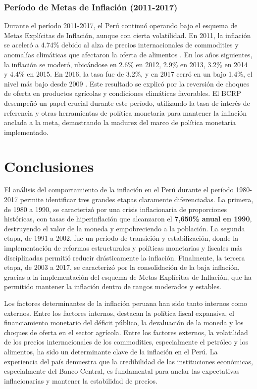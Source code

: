 \documentclass[
  stu,
  floatsintext,
  longtable,
  a4paper,
  nolmodern,
  notxfonts,
  notimes,
  12pt,
  colorlinks=true,linkcolor=blue,citecolor=blue,urlcolor=blue]{apa7}
\begin{document}
\subsubsection{Período de Metas de Inflación
(2011-2017)}\label{peruxedodo-de-metas-de-inflaciuxf3n-2011-2017}

Durante el período 2011-2017, el Perú continuó operando bajo el esquema
de Metas Explícitas de Inflación, aunque con cierta volatilidad. En
2011, la inflación se aceleró a 4.74\% debido al alza de precios
internacionales de commodities y anomalías climáticas que afectaron la
oferta de alimentos . En los años siguientes, la inflación se moderó,
ubicándose en 2.6\% en 2012, 2.9\% en 2013, 3.2\% en 2014 y 4.4\% en
2015. En 2016, la tasa fue de 3.2\%, y en 2017 cerró en un bajo 1.4\%,
el nivel más bajo desde 2009 . Este resultado se explicó por la
reversión de choques de oferta en productos agrícolas y condiciones
climáticas favorables. El BCRP desempeñó un papel crucial durante este
período, utilizando la tasa de interés de referencia y otras
herramientas de política monetaria para mantener la inflación anclada a
la meta, demostrando la madurez del marco de política monetaria
implementado.

\section{Conclusiones}\label{conclusiones}

El análisis del comportamiento de la inflación en el Perú durante el
período 1980-2017 permite identificar tres grandes etapas claramente
diferenciadas. La primera, de 1980 a 1990, se caracterizó por una crisis
inflacionaria de proporciones históricas, con tasas de hiperinflación
que alcanzaron el \textbf{7,650\% anual en 1990}, destruyendo el valor
de la moneda y empobreciendo a la población. La segunda etapa, de 1991 a
2002, fue un período de transición y estabilización, donde la
implementación de reformas estructurales y políticas monetarias y
fiscales más disciplinadas permitió reducir drásticamente la inflación.
Finalmente, la tercera etapa, de 2003 a 2017, se caracterizó por la
consolidación de la baja inflación, gracias a la implementación del
esquema de Metas Explícitas de Inflación, que ha permitido mantener la
inflación dentro de rangos moderados y estables.

Los factores determinantes de la inflación peruana han sido tanto
internos como externos. Entre los factores internos, destacan la
política fiscal expansiva, el financiamiento monetario del déficit
público, la devaluación de la moneda y los choques de oferta en el
sector agrícola. Entre los factores externos, la volatilidad de los
precios internacionales de los commodities, especialmente el petróleo y
los alimentos, ha sido un determinante clave de la inflación en el Perú.
La experiencia del país demuestra que la credibilidad de las
instituciones económicas, especialmente del Banco Central, es
fundamental para anclar las expectativas inflacionarias y mantener la
estabilidad de precios.
\end{document}
